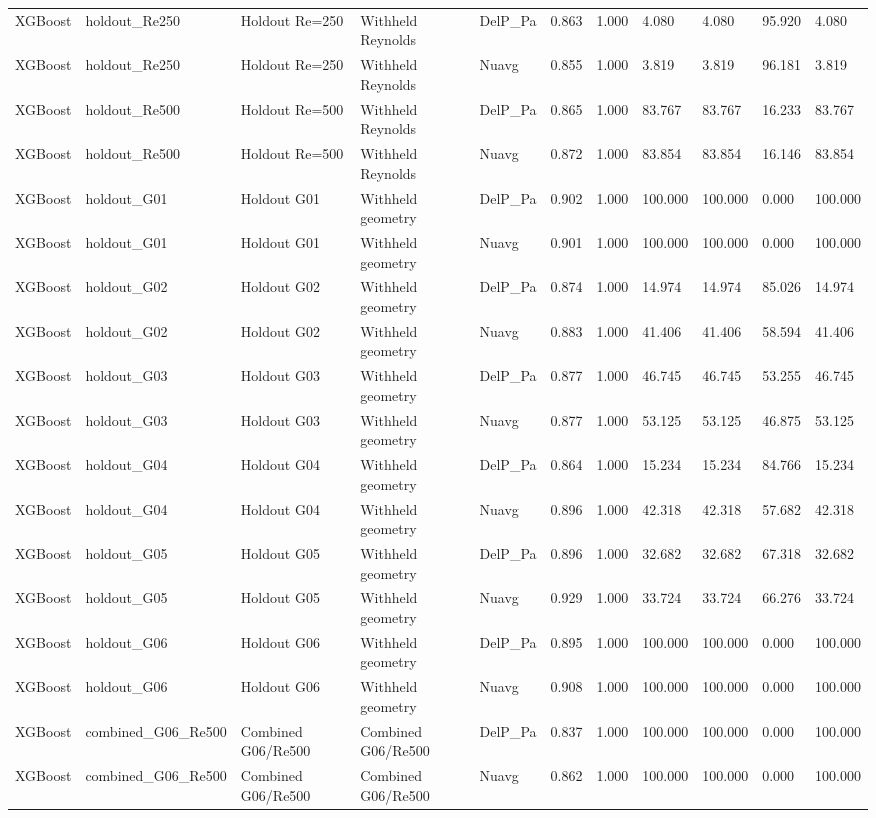 \begin{tabular}{lllllllllll}
XGBoost & holdout_Re250 & Holdout Re=250 & Withheld Reynolds & DelP_Pa & 0.863 & 1.000 & 4.080 & 4.080 & 95.920 & 4.080 \\
XGBoost & holdout_Re250 & Holdout Re=250 & Withheld Reynolds & Nuavg & 0.855 & 1.000 & 3.819 & 3.819 & 96.181 & 3.819 \\
XGBoost & holdout_Re500 & Holdout Re=500 & Withheld Reynolds & DelP_Pa & 0.865 & 1.000 & 83.767 & 83.767 & 16.233 & 83.767 \\
XGBoost & holdout_Re500 & Holdout Re=500 & Withheld Reynolds & Nuavg & 0.872 & 1.000 & 83.854 & 83.854 & 16.146 & 83.854 \\
XGBoost & holdout_G01 & Holdout G01 & Withheld geometry & DelP_Pa & 0.902 & 1.000 & 100.000 & 100.000 & 0.000 & 100.000 \\
XGBoost & holdout_G01 & Holdout G01 & Withheld geometry & Nuavg & 0.901 & 1.000 & 100.000 & 100.000 & 0.000 & 100.000 \\
XGBoost & holdout_G02 & Holdout G02 & Withheld geometry & DelP_Pa & 0.874 & 1.000 & 14.974 & 14.974 & 85.026 & 14.974 \\
XGBoost & holdout_G02 & Holdout G02 & Withheld geometry & Nuavg & 0.883 & 1.000 & 41.406 & 41.406 & 58.594 & 41.406 \\
XGBoost & holdout_G03 & Holdout G03 & Withheld geometry & DelP_Pa & 0.877 & 1.000 & 46.745 & 46.745 & 53.255 & 46.745 \\
XGBoost & holdout_G03 & Holdout G03 & Withheld geometry & Nuavg & 0.877 & 1.000 & 53.125 & 53.125 & 46.875 & 53.125 \\
XGBoost & holdout_G04 & Holdout G04 & Withheld geometry & DelP_Pa & 0.864 & 1.000 & 15.234 & 15.234 & 84.766 & 15.234 \\
XGBoost & holdout_G04 & Holdout G04 & Withheld geometry & Nuavg & 0.896 & 1.000 & 42.318 & 42.318 & 57.682 & 42.318 \\
XGBoost & holdout_G05 & Holdout G05 & Withheld geometry & DelP_Pa & 0.896 & 1.000 & 32.682 & 32.682 & 67.318 & 32.682 \\
XGBoost & holdout_G05 & Holdout G05 & Withheld geometry & Nuavg & 0.929 & 1.000 & 33.724 & 33.724 & 66.276 & 33.724 \\
XGBoost & holdout_G06 & Holdout G06 & Withheld geometry & DelP_Pa & 0.895 & 1.000 & 100.000 & 100.000 & 0.000 & 100.000 \\
XGBoost & holdout_G06 & Holdout G06 & Withheld geometry & Nuavg & 0.908 & 1.000 & 100.000 & 100.000 & 0.000 & 100.000 \\
XGBoost & combined_G06_Re500 & Combined G06/Re500 & Combined G06/Re500 & DelP_Pa & 0.837 & 1.000 & 100.000 & 100.000 & 0.000 & 100.000 \\
XGBoost & combined_G06_Re500 & Combined G06/Re500 & Combined G06/Re500 & Nuavg & 0.862 & 1.000 & 100.000 & 100.000 & 0.000 & 100.000 \\
\hline
\end{tabular}

